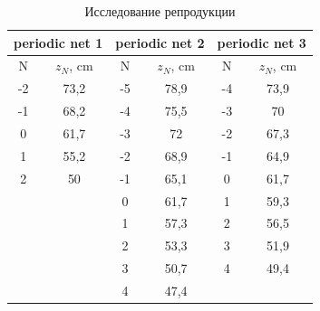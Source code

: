 \documentclass[a4paper, 12pt]{article}
\begin{document}
	\begin{table}[h!]\label{tab:reproduct}
		\centering
		\caption{Исследование репродукции}
		\begin{tabular}{|c|c|c|c|c|c|}
			\hline
			\multicolumn{2}{|c|}{periodic net 1}         & \multicolumn{2}{c|}{periodic net 2} & \multicolumn{2}{c|}{periodic net 3} \\ \hline
			N               & $z_N$, cm              & N           & $z_N$, cm         & N           & $z_N$, cm         \\ \hline
			-2              & 73,2                  & -5          & 78,9             & -4          & 73,9             \\ \hline
			-1              & 68,2                  & -4          & 75,5             & -3          & 70               \\ \hline
			0               & 61,7                  & -3          & 72               & -2          & 67,3             \\ \hline
			1               & 55,2                  & -2          & 68,9             & -1          & 64,9             \\ \hline
			2               & 50                    & -1          & 65,1             & 0           & 61,7             \\ \hline
			\multicolumn{2}{|c|}{\multirow{5}{*}{}} & 0           & 61,7             & 1           & 59,3             \\ \cline{3-6} 
			\multicolumn{2}{|c|}{}                  & 1           & 57,3             & 2           & 56,5             \\ \cline{3-6} 
			\multicolumn{2}{|c|}{}                  & 2           & 53,3             & 3           & 51,9             \\ \cline{3-6} 
			\multicolumn{2}{|c|}{}                  & 3           & 50,7             & 4           & 49,4             \\ \cline{3-6} 
			\multicolumn{2}{|c|}{}                  & 4           & 47,4             & \multicolumn{2}{c|}{}          \\ \hline
		\end{tabular}
	\end{table}
\end{document}
